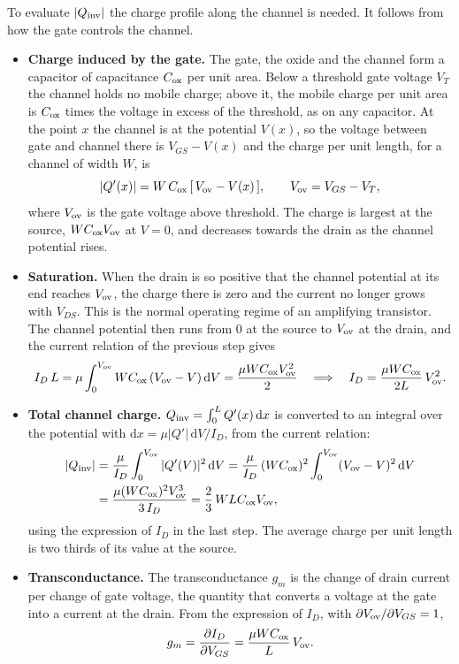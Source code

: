 \documentclass[11pt,a4paper]{article}
\newcommand{\dd}{\mathrm{d}}
\begin{document}
To evaluate $|Q_{\rm inv}|$ the charge profile along the channel is
needed. It follows from how the gate controls the channel.
%
\begin{itemize}
\item \textbf{Charge induced by the gate.} The gate, the oxide and the
  channel form a capacitor of capacitance $C_{\rm ox}$ per unit area. Below
  a threshold gate voltage $V_T$ the channel holds no mobile charge; above
  it, the mobile charge per unit area is $C_{\rm ox}$ times the voltage in
  excess of the threshold, as on any capacitor. At the point $x$ the channel
  is at the potential $V(x)$, so the voltage between gate and channel there
  is $V_{GS}-V(x)$ and the charge per unit length, for a channel of width
  $W$, is
%
  \[
   |Q'(x)| = W\,C_{\rm ox}\,[\,V_{\rm ov}-V(x)\,],
   \qquad V_{\rm ov} = V_{GS}-V_T ,
  \]
%
  where $V_{\rm ov}$ is the gate voltage above threshold. The charge is
  largest at the source, $WC_{\rm ox}V_{\rm ov}$ at $V=0$, and decreases
  towards the drain as the channel potential rises.
\item \textbf{Saturation.} When the drain is so positive that the channel
  potential at its end reaches $V_{\rm ov}$, the charge there is zero and
  the current no longer grows with $V_{DS}$. This is the normal operating
  regime of an amplifying transistor. The channel potential then runs from
  $0$ at the source to $V_{\rm ov}$ at the drain, and the current relation
  of the previous step gives
%
  \[
   I_D\,L = \mu\int_0^{V_{\rm ov}} WC_{\rm ox}\,(V_{\rm ov}-V)\,\dd V
          = \frac{\mu WC_{\rm ox}V_{\rm ov}^2}{2}
   \quad\Longrightarrow\quad
   I_D = \frac{\mu WC_{\rm ox}}{2L}\,V_{\rm ov}^2 .
  \]
%
\item \textbf{Total channel charge.} $Q_{\rm inv}=\int_0^L Q'(x)\,\dd x$
  is converted to an integral over the potential with
  $\dd x=\mu|Q'|\,\dd V/I_D$, from the current relation:
%
  \begin{align*}
   |Q_{\rm inv}| &= \frac{\mu}{I_D}\int_0^{V_{\rm ov}}|Q'(V)|^2\,\dd V
   = \frac{\mu}{I_D}\,(WC_{\rm ox})^2\int_0^{V_{\rm ov}}(V_{\rm ov}-V)^2\,\dd V \\
   &= \frac{\mu(WC_{\rm ox})^2V_{\rm ov}^3}{3\,I_D}
   = \frac23\,WLC_{\rm ox}V_{\rm ov} ,
  \end{align*}
%
  using the expression of $I_D$ in the last step. The average charge per
  unit length is two thirds of its value at the source.
\item \textbf{Transconductance.} The transconductance $g_m$ is the change
  of drain current per change of gate voltage, the quantity that converts
  a voltage at the gate into a current at the drain. From the expression of
  $I_D$, with $\partial V_{\rm ov}/\partial V_{GS}=1$,
%
  \[
   g_m = \frac{\partial I_D}{\partial V_{GS}}
       = \frac{\mu WC_{\rm ox}}{L}\,V_{\rm ov} .
  \]
%
\end{itemize}
\end{document}
